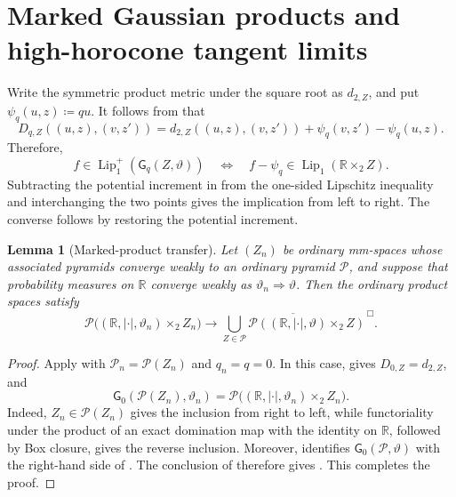 \documentclass{amsart}
\numberwithin{equation}{section}
\theoremstyle{plain}
\newtheorem{lemma}[theorem]{Lemma}
\theoremstyle{definition}
\theoremstyle{remark}
\newcommand{\R}{\mathbb R}
\newcommand{\Pyr}{\mathcal P}
\newcommand{\Lipplus}{\operatorname{Lip}^{+}_{1}}
\begin{document}
\section{Marked Gaussian products and high-horocone tangent limits}\label{app:marked-product-proofs}

Write the symmetric product metric under the square root as $d_{2,Z}$, and put $\psi_q(u,z)\coloneqq qu$.  It follows from
 that
\begin{equation}\label{eq:Dq-potential}
 D_{q,Z}((u,z),(v,z'))=d_{2,Z}((u,z),(v,z'))+\psi_q(v,z')-\psi_q(u,z).
\end{equation}
Therefore,
\begin{equation}\label{eq:Dq-observables}
 f\in\Lipplus(\mathsf G_q(Z,\vartheta))
 \quad\Longleftrightarrow\quad
 f-\psi_q\in\operatorname{Lip}_1(\R\times_2 Z).
\end{equation}
Subtracting the potential increment in  from the one-sided Lipschitz inequality and interchanging the
two points gives the implication from left to right.  The converse follows by restoring the potential increment.

\begin{lemma}[Marked-product transfer]
\label{lem:marked-product-transfer}
Let $(Z_n)$ be ordinary mm-spaces whose associated pyramids converge weakly to an ordinary pyramid $\mathcal P$, and
suppose that probability measures on $\R$ converge weakly as $\vartheta_n\Rightarrow\vartheta$.  Then the ordinary product
spaces satisfy
\begin{equation}\label{eq:ordinary-marked-product-limit}
 \Pyr\bigl((\R,|\cdot|,\vartheta_n)\times_2 Z_n\bigr)
 \longrightarrow
 \overline{\bigcup_{Z\in\mathcal P}
 \Pyr((\R,|\cdot|,\vartheta)\times_2 Z)}^{\,\Box}.
\end{equation}
\end{lemma}

\begin{proof}
Apply  with $\mathcal P_n=\Pyr(Z_n)$ and $q_n=q=0$.  In this case,
 gives $D_{0,Z}=d_{2,Z}$, and
\[
 \mathsf G_0(\Pyr(Z_n),\vartheta_n)
 =\Pyr\bigl((\R,|\cdot|,\vartheta_n)\times_2 Z_n\bigr).
\]
Indeed, $Z_n\in\Pyr(Z_n)$ gives the inclusion from right to left, while functoriality under the product of an exact
domination map with the identity on $\R$, followed by Box closure, gives the reverse inclusion.  Moreover,
 identifies $\mathsf G_0(\mathcal P,\vartheta)$ with the right-hand side of
.  The conclusion of  therefore gives
.  This completes the proof.
\end{proof}
\end{document}
